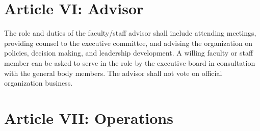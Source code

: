 \documentclass[11pt]{article}
\begin{document}
    \section{Article VI: Advisor}

    The role and duties of the faculty/staff advisor shall include attending meetings, providing counsel to the executive committee, and advising the organization on policies, decision making, and leadership development.
    A willing faculty or staff member can be asked to serve in the role by the executive board in consultation with the general body members.
    The advisor shall not vote on official organization business.


    \section{Article VII: Operations}
\end{document}
